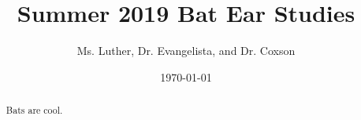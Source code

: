 \documentclass{article}
\title{Summer 2019 Bat Ear Studies}
\author{Ms. Luther, Dr. Evangelista, and Dr. Coxson}
\date{\today}
\begin{document}
\maketitle

\begin{abstract}
  Bats are cool. 
\end{abstract}
\end{document}

